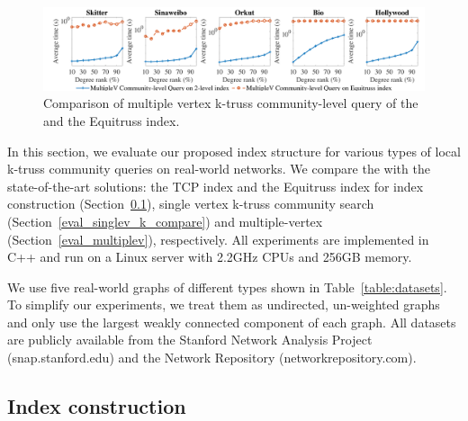 \begin{figure}[h]
    \centering
    \includegraphics[width=0.9\linewidth, trim={0cm 0cm, 0cm, 0.3cm}, clip]{./figures/multiplev_k_compare_small.pdf}
    \caption{Comparison of multiple vertex k-truss community-level query of the \twolevelindex{} and the Equitruss index.}
    \label{fig:multiplev_k_compare}
		\vspace{-0.3cm}
\end{figure}

In this section, we evaluate our proposed index structure for various types of local k-truss community queries on real-world networks. We compare the \twolevelindex{} with the state-of-the-art solutions: the TCP index \cite{huang2014querying} and the Equitruss index \cite{akbas2017truss} for index construction (Section~\ref{eval_const}), single vertex k-truss community search (Section~\ref{eval_singlev_k_compare}) and multiple-vertex \probdef{} (Section~\ref{eval_multiplev}), respectively. All experiments are implemented in C++ and run on a Linux server with 2.2GHz CPUs and 256GB memory. 

We use five real-world graphs of different types shown in Table~\ref{table:datasets}. To simplify our experiments, we treat them as undirected, un-weighted graphs and only use the largest weakly connected component of each graph. %
All datasets are publicly available from the Stanford Network Analysis Project (snap.stanford.edu) and the Network Repository (networkrepository.com).

\subsection{Index construction}
\label{eval_const}

